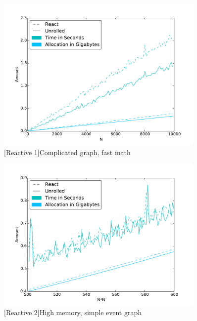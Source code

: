 \begin{figure}
\centering
    \begin{minipage}{.5\textwidth}
        \centering
        \includegraphics[width=0.9\textwidth]{graphics/react_bench_2.pdf}
        [Reactive 1]{Complicated graph, fast math}
        \label{fig:reactive1}
    \end{minipage}%
    \begin{minipage}{.5\textwidth}
        \centering
        \includegraphics[width=0.9\textwidth]{graphics/react_bench_1.pdf}
        [Reactive 2]{High memory, simple event graph}
        \label{fig:reactive2}
    \end{minipage}
\end{figure}

